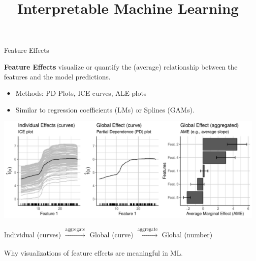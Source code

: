 \documentclass[11pt,compress,t,notes=noshow, xcolor=table]{beamer}
\title{Interpretable Machine Learning}
\institute{\href{https://compstat-lmu.github.io/lecture_iml/}{compstat-lmu.github.io/lecture\_iml}}
\date{}
\begin{document}





\begin{vbframe}{Feature Effects}

\textbf{Feature Effects} visualize or quantify the (average) relationship between the features and the model predictions. %
\begin{itemize}
\item Methods: PD Plots, ICE curves, ALE plots
\item Similar to regression coefficients (LMs) or Splines (GAMs).
\end{itemize}

\centerline{\includegraphics[width=\textwidth]{figure_man/feature-effects.pdf}}

\hspace{8px} \small Individual (curves) \hspace{2px}
$\xrightarrow[]{\text{aggregate}}$ \hspace{2px} Global (curve) \hspace{2px}
$\xrightarrow[]{\text{aggregate}}$ \hspace{2px} Global (number)

\framebreak

Why visualizations of feature effects are meaningful in ML.

\lz

\end{vbframe}
\end{document}

